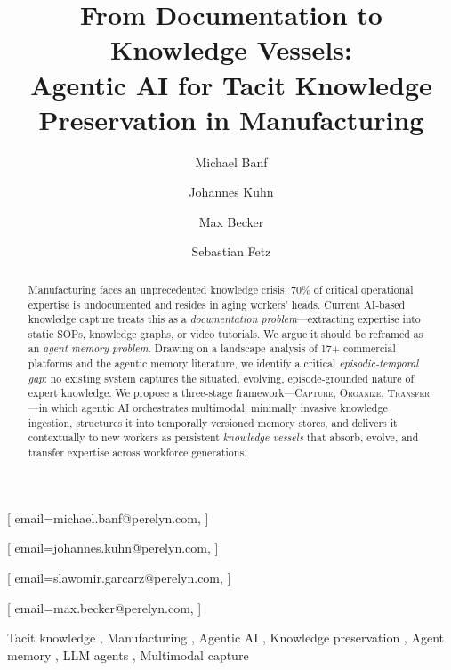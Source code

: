 \documentclass[]{ceurart}
\begin{document}


\title{From Documentation to Knowledge Vessels:\\Agentic AI for Tacit
  Knowledge Preservation in Manufacturing}

\author{Michael Banf}[%
  email=michael.banf@perelyn.com,
]
\cormark[1]
\author{Johannes Kuhn}[%
  email=johannes.kuhn@perelyn.com,
]
\author{Max Becker}[%
  email=slawomir.garcarz@perelyn.com,
]
\author{Sebastian Fetz}[%
  email=max.becker@perelyn.com,
]

\address{Perelyn GmbH, Munich, Germany}


\begin{abstract}
Manufacturing faces an unprecedented knowledge crisis: 70\% of critical
operational expertise is undocumented and resides in aging workers'
heads. Current AI-based knowledge capture treats this as a
\emph{documentation problem}---extracting expertise into static SOPs,
knowledge graphs, or video tutorials. We argue it should be reframed as
an \emph{agent memory problem}. Drawing on a landscape analysis of 17+
commercial platforms and the agentic memory literature, we identify a
critical \emph{episodic-temporal gap}: no existing system captures the
situated, evolving, episode-grounded nature of expert knowledge. We
propose a three-stage framework---\textsc{Capture},
\textsc{Organize}, \textsc{Transfer}---in which agentic AI orchestrates
multimodal, minimally invasive knowledge ingestion, structures it into
temporally versioned memory stores, and delivers it contextually to new
workers as persistent \emph{knowledge vessels} that absorb, evolve, and
transfer expertise across workforce generations.
\end{abstract}

\begin{keywords}
  Tacit knowledge \sep
  Manufacturing \sep
  Agentic AI \sep
  Knowledge preservation \sep
  Agent memory \sep
  LLM agents \sep
  Multimodal capture
\end{keywords}

\maketitle
\end{document}
